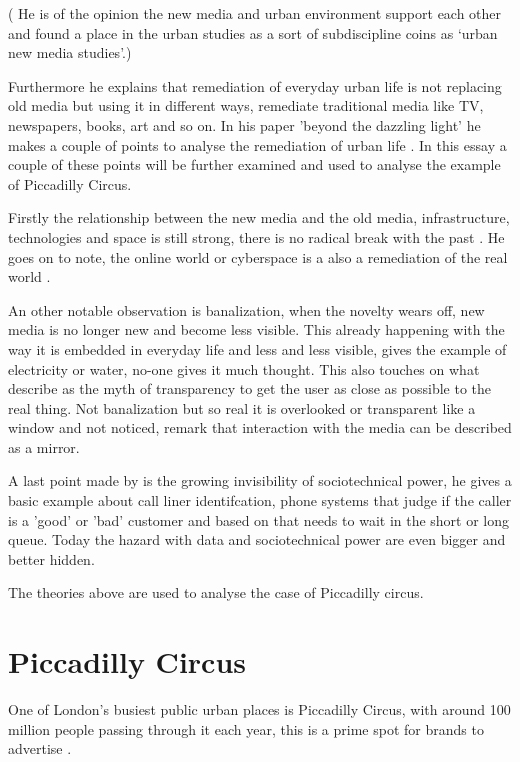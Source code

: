 \documentclass[a4paper, 11pt]{article}
\begin{document}
( He is of the opinion the new media and urban environment support each other and found a place in the urban studies as a sort of subdiscipline \cite{Graham} coins as ‘urban new media studies’.)

Furthermore he explains that remediation of everyday urban life is not replacing old media but using it in different ways, remediate traditional media like TV, newspapers, books, art and so on. In his paper 'beyond the dazzling light' he makes a couple of points to analyse the remediation of urban life \citep{Graham}. In this essay a couple of these points will be further examined and used to analyse the example of Piccadilly Circus.

Firstly the relationship between the new media and the old media, infrastructure, technologies and space is still strong, there is no radical break with the past \cite{Graham}. He goes on to note, the online world or cyberspace is a also a remediation of the real world \cite{Graham}.

An other notable observation is banalization, when the novelty wears off, new media is no longer new and become less visible. This already happening with the way it is embedded in everyday life and less and less visible, \cite{Graham} gives the example of electricity or water, no-one gives it much thought. This also touches on what \cite{bolter2003} describe as the myth of transparency to get the user as close as possible to the real thing. Not banalization but so real it is overlooked or transparent like a window and not noticed, \cite{bolter2003} remark that interaction with the media can be described as a mirror.

A last point made by \cite{Graham} is the growing invisibility of sociotechnical power, he gives a basic example about call liner identifcation, phone systems that judge if the caller is a 'good' or 'bad' customer and based on that needs to wait in the short or long queue. Today the hazard with data and sociotechnical power are even bigger and better hidden. 


The theories above are used to analyse the case of Piccadilly circus. 


\section{Piccadilly Circus}


One of London's busiest public urban places is Piccadilly Circus, with around 100 million people passing through it each year, this is a prime spot for brands to advertise \citep{Dezeen}.
\end{document}
